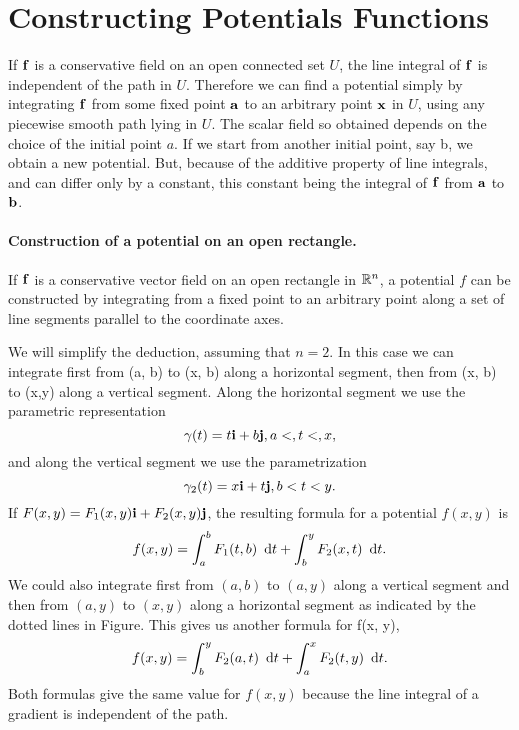 \section{Constructing Potentials Functions}

If $\mathbf{ f}$  is a conservative field on an open connected set $U$, the line
integral of $\mathbf{ f}$ is independent of the path in $U$. Therefore we can find a potential  simply by
integrating $\mathbf{ f}$ from some fixed point $\mathbf{ a}$ to an arbitrary point $\mathbf{ x}$ in $U$, using any piecewise
smooth path lying in $U$. The scalar field so obtained depends on the choice of the initial
point $ a$. If we start from another initial point, say b, we obtain a new potential.
But, because of the additive property of line integrals,  and  can differ only by a constant,
this constant being the integral of $\mathbf{ f}$ from $\mathbf{ a}$ to $\mathbf{ b}$.


\paragraph{Construction of a potential on an open rectangle.}

If $\mathbf{ f}$ is a conservative vector field
on an open rectangle in $\mathbb{R}^n$, a potential $f$ can be constructed by integrating from a fixed
point to an arbitrary point along a set of line segments parallel to the coordinate axes.

\begin{figure}[h]
 \centering
 
\end{figure}

We will simplify the deduction, assuming that $n=2$. In this case we can integrate first from (a, b) to
(x, b) along a horizontal segment, then from (x, b) to (x,y) along a vertical segment.
Along the horizontal segment we use the parametric representation
\[\gamma(t)=t\mathbf{ i} + b\mathbf{ j}, a<,t<,x,\]
and along the vertical segment we use the parametrization
\[\gamma_2(t) = x\mathbf{ i} + t\mathbf{ j}, b<t<y.\]
If $F(x,y) = F_1(x,y)\mathbf{ i} + F_2(x,y)\mathbf{ j}$, the resulting formula for a potential $f(x, y)$ is
\[ f(x, y) = \dint_a^b F_1(t, b) \dt + \dint_b^y F_2(x, t) \dt.\]
We could also integrate first from $(a, b)$ to $(a, y)$ along a vertical segment and then from
$(a, y)$ to $(x, y)$ along a horizontal segment as indicated by the dotted lines in Figure.
This gives us another formula for f(x, y),
\[f(x, y) = \dint_b^y F_2(a, t) \dt + \dint_a^x  F_2(t, y) \dt.\]
Both formulas  give the same value for $f(x, y)$ because the line integral
of a gradient is independent of the path.
 
